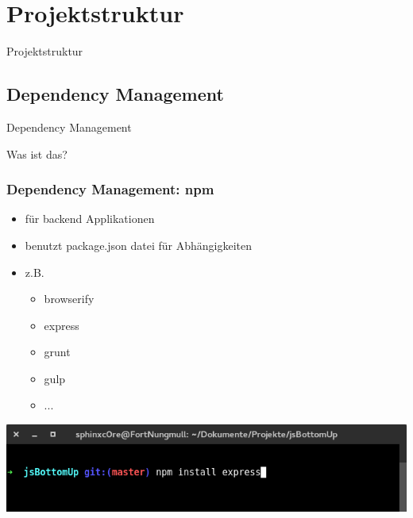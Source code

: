 \documentclass{beamer}
\begin{document}

\section{Projektstruktur}

\begin{frame}
\Huge{
\centerline{Projektstruktur}
}
\end{frame}


\subsection{Dependency Management}

\begin{frame}
\Huge{
\centerline{Dependency Management}
\centerline{{\small Was ist das?}}
}
\end{frame}


\begin{frame}
\frametitle{Dependency Management: npm}
\begin{itemize}
\item für backend Applikationen
\item benutzt package.json datei für Abhängigkeiten
\item z.B.
\begin{itemize}
\item browserify
\item express
\item grunt
\item gulp
\item ...
\end{itemize}
\end{itemize}
\includegraphics[scale=0.3]{assets/npm-cli.png}
\end{frame}

\end{document}
